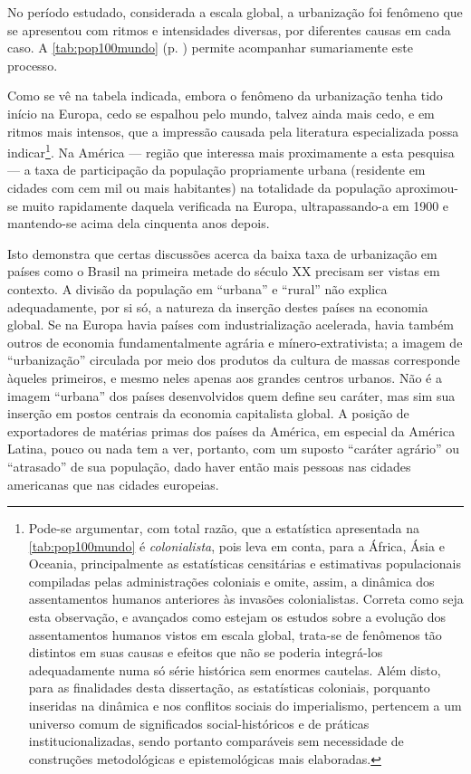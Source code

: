 No período estudado, considerada a escala global, a urbanização foi fenômeno que se apresentou com ritmos e intensidades diversas, por diferentes causas em cada caso. A \autoref{tab:pop100mundo} (p. \pageref{tab:pop100mundo}) permite acompanhar sumariamente este processo.



Como se vê na tabela indicada, embora o fenômeno da urbanização tenha tido início na Europa, cedo se espalhou pelo mundo, talvez ainda mais cedo, e em ritmos mais intensos, que a impressão causada pela literatura especializada possa indicar\footnote{Pode-se argumentar, com total razão, que a estatística apresentada na \autoref{tab:pop100mundo} é \textit{colonialista}, pois leva em conta, para a África, Ásia e Oceania, principalmente as estatísticas censitárias e estimativas populacionais compiladas pelas administrações coloniais e omite, assim, a dinâmica dos assentamentos humanos anteriores às invasões colonialistas. Correta como seja esta observação, e avançados como estejam os estudos sobre a evolução dos assentamentos humanos vistos em escala global, trata-se de fenômenos tão distintos em suas causas e efeitos que não se poderia integrá-los adequadamente numa só série histórica sem enormes cautelas. Além disto, para as finalidades desta dissertação, as estatísticas coloniais, porquanto inseridas na dinâmica e nos conflitos sociais do imperialismo, pertencem a um universo comum de significados social-históricos e de práticas institucionalizadas, sendo portanto comparáveis sem necessidade de construções metodológicas e epistemológicas mais elaboradas.}. Na América --- região que interessa mais proximamente a esta pesquisa --- a taxa de participação da população propriamente urbana (residente em cidades com cem mil ou mais habitantes) na totalidade da população aproximou-se muito rapidamente daquela verificada na Europa, ultrapassando-a em 1900 e mantendo-se acima dela cinquenta anos depois. 

Isto demonstra que certas discussões acerca da baixa taxa de urbanização em países como o Brasil na primeira metade do século XX precisam ser vistas em contexto. A divisão da população em ``urbana'' e ``rural'' não explica adequadamente, por si só, a natureza da inserção destes países na economia global. Se na Europa havia países com industrialização acelerada, havia também outros de economia fundamentalmente agrária e mínero-extrativista; a imagem de ``urbanização'' circulada por meio dos produtos da cultura de massas corresponde àqueles primeiros, e mesmo neles apenas aos grandes centros urbanos. Não é a imagem ``urbana'' dos países desenvolvidos quem define seu caráter, mas sim sua inserção em postos centrais da economia capitalista global. A posição de exportadores de matérias primas dos países da América, em especial da América Latina, pouco ou nada tem a ver, portanto, com um suposto ``caráter agrário'' ou ``atrasado'' de sua população, dado haver então mais pessoas nas cidades americanas que nas cidades europeias.

